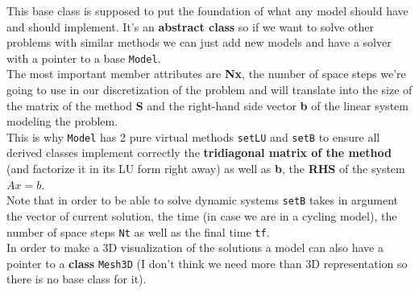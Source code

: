 \documentclass{article}
\begin{document}
This base class is supposed to put the foundation of what any model should have and should implement. It's an \textbf{abstract class} so if we want to solve other problems with similar methods we can just add new models and have a solver with a pointer to a base \texttt{Model}. \\

The most important member attributes are \textbf{Nx}, the number of space steps we're going to use in our discretization of the problem and will translate into the size of the matrix of the method \textbf{S} and the right-hand side vector \textbf{b} of the linear system modeling the problem. \\

This is why \texttt{Model} has 2 pure virtual methods \texttt{setLU} and \texttt{setB} to ensure all derived classes implement correctly the \textbf{tridiagonal matrix of the method} (and factorize it in its LU form right away) as well as \textbf{b}, the \textbf{RHS} of the system $Ax=b$.\\
Note that in order to be able to solve dynamic systems \texttt{setB} takes in argument the vector of current solution, the time (in case we are in a cycling model), the number of space steps \texttt{Nt} as well as the final time \texttt{tf}.\\

In order to make a 3D visualization of the solutions a model can also have a pointer to a \textbf{class} \texttt{Mesh3D} (I don't think we need more than 3D representation so there is no base class for it).
\end{document}
